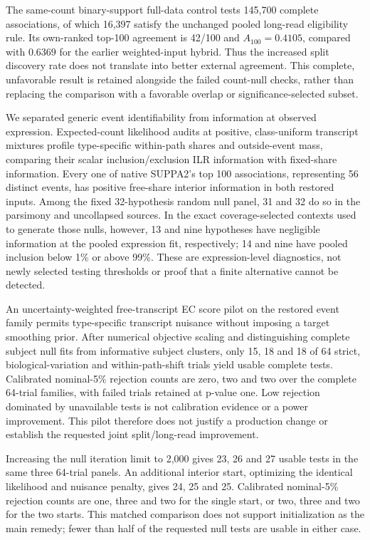 \documentclass[11pt]{article}
\begin{document}
The same-count binary-support full-data control tests 145,700 complete associations, of which 16,397 satisfy the unchanged pooled long-read eligibility rule. Its own-ranked top-100 agreement is 42/100 and \(A_{100}=0.4105\), compared with \(0.6369\) for the earlier weighted-input hybrid. Thus the increased split discovery rate does not translate into better external agreement. This complete, unfavorable result is retained alongside the failed count-null checks, rather than replacing the comparison with a favorable overlap or significance-selected subset.

We separated generic event identifiability from information at observed expression. Expected-count likelihood audits at positive, class-uniform transcript mixtures profile type-specific within-path shares and outside-event mass, comparing their scalar inclusion/exclusion ILR information with fixed-share information. Every one of native SUPPA2's top 100 associations, representing 56 distinct events, has positive free-share interior information in both restored inputs. Among the fixed 32-hypothesis random null panel, 31 and 32 do so in the parsimony and uncollapsed sources. In the exact coverage-selected contexts used to generate those nulls, however, 13 and nine hypotheses have negligible information at the pooled expression fit, respectively; 14 and nine have pooled inclusion below 1\% or above 99\%. These are expression-level diagnostics, not newly selected testing thresholds or proof that a finite alternative cannot be detected.

An uncertainty-weighted free-transcript EC score pilot on the restored event family permits type-specific transcript nuisance without imposing a target smoothing prior. After numerical objective scaling and distinguishing complete subject null fits from informative subject clusters, only 15, 18 and 18 of 64 strict, biological-variation and within-path-shift trials yield usable complete tests. Calibrated nominal-5\% rejection counts are zero, two and two over the complete 64-trial families, with failed trials retained at p-value one. Low rejection dominated by unavailable tests is not calibration evidence or a power improvement. This pilot therefore does not justify a production change or establish the requested joint split/long-read improvement.

Increasing the null iteration limit to 2,000 gives 23, 26 and 27 usable tests in the same three 64-trial panels. An additional interior start, optimizing the identical likelihood and nuisance penalty, gives 24, 25 and 25. Calibrated nominal-5\% rejection counts are one, three and two for the single start, or two, three and two for the two starts. This matched comparison does not support initialization as the main remedy; fewer than half of the requested null tests are usable in either case.
\end{document}
